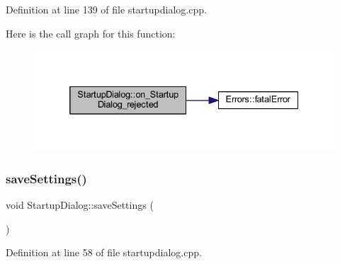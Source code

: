 Definition at line 139 of file startupdialog.\+cpp.

Here is the call graph for this function\+:
\nopagebreak
\begin{figure}[H]
\begin{center}
\leavevmode
\includegraphics[width=332pt]{class_startup_dialog_a49bcc6d2a28e82654ab583aba08f0ba5_cgraph}
\end{center}
\end{figure}
\mbox{\label{class_startup_dialog_a2c474c7787e0ea42958cb48f12f4e5c7}} 
\subsubsection{\texorpdfstring{saveSettings()}{saveSettings()}}
{\footnotesize\ttfamily void Startup\+Dialog\+::save\+Settings (\begin{DoxyParamCaption}{ }\end{DoxyParamCaption})\hspace{0.3cm}{\ttfamily [private]}}



Definition at line 58 of file startupdialog.\+cpp.

